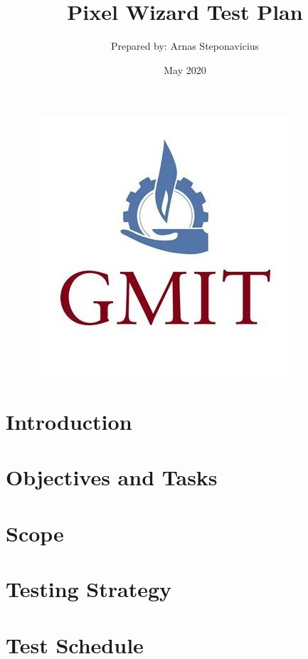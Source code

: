 \documentclass{article}
\begin{document}
\begin{figure}
    \centering
    \includegraphics[scale = 0.25]{images/gmit.jpg}
    \label{fig:gmit}
\end{figure}

\title{Pixel Wizard Test Plan}
\author{Prepared by: Arnas Steponavicius }
\date{May 2020}

\maketitle

\tableofcontents

\section{Introduction}
\newpage

\section{Objectives and Tasks}
\newpage

\section{Scope}
\newpage

\section{Testing Strategy}
\newpage

\section{Test Schedule}
\newpage
\end{document}

